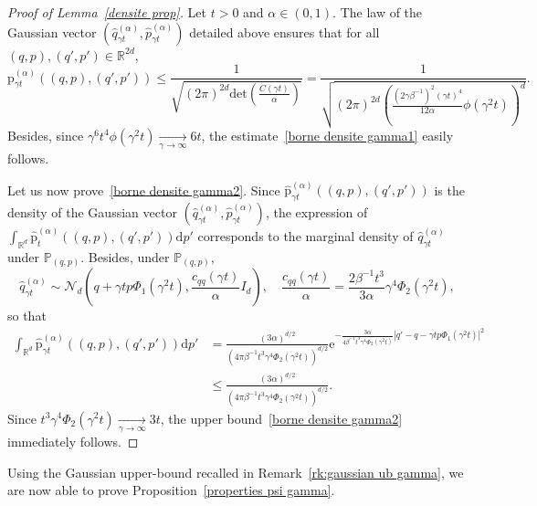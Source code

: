 \documentclass[preprint,EJP]{ejpecp}
\begin{document}
\begin{proof}[Proof of Lemma~\ref{densite prop}]
Let $t>0$ and $\alpha\in(0,1)$. The law of the Gaussian vector $(\widehat{q}_{\gamma t}^{(\alpha)},\widehat{p}_{\gamma t}^{(\alpha)})$ detailed above ensures that for all $(q,p),(q',p')\in\mathbb{R}^{2d}$,
$$\mathrm{p}^{(\alpha)}_{\gamma t}((q,p),(q',p'))\leq\frac{1}{ \sqrt{(2 \pi)^{2d} \mathrm{det}\left(\frac{C(\gamma t)}{\alpha}\right)}}=\frac{1}{ \sqrt{(2 \pi)^{2d} \left(\frac{(2\gamma\beta^{-1})^2 (\gamma t)^4}{12\alpha} \phi(\gamma^2 t)\right)^d}}.$$
Besides, since $\gamma^6 t^4 \phi(\gamma^2 t)\underset{\gamma\rightarrow\infty}{\longrightarrow}6 t$, the estimate~\eqref{borne densite gamma1} easily follows. 

Let us now prove~\eqref{borne densite gamma2}. Since
$\widehat{\mathrm{p}}^{(\alpha)}_{\gamma t}((q,p),(q',p'))$ is the density of the Gaussian vector $(\widehat{q}^{(\alpha)}_{\gamma t}, \widehat{p}^{(\alpha)}_{\gamma t})$, the
expression of
$\int_{\mathbb{R}^d}\widehat{\mathrm{p}}^{(\alpha)}_t((q,p),(q',p'))
\mathrm{d}p'$ corresponds to the marginal density of $\widehat{q}^{(\alpha)}_{\gamma t}$ under $\mathbb{P}_{(q,p)}$. Besides, under $\mathbb{P}_{(q,p)}$, 
\begin{equation*}
  \widehat{q}^{(\alpha)}_{\gamma t} \sim \mathcal{N}_d\left(q + \gamma tp\Phi_1(\gamma^2 t), \frac{c_{qq}(\gamma t)}{\alpha}I_d\right),\quad \frac{c_{qq}(\gamma t)}{\alpha} = \frac{2\beta^{-1} t^3}{3\alpha}\gamma^4\Phi_2(\gamma^2 t),
\end{equation*}
so that  
 \begin{align*}
   \int_{\mathbb{R}^d}\widehat{\mathrm{p}}^{(\alpha)}_{\gamma t}((q,p),(q',p')) \mathrm{d}p'&=\frac{(3\alpha)^{d/2}}{\left(4 \pi\beta^{-1}t^3 \gamma^4\Phi_2(\gamma^2 t)\right)^{d/2}} \mathrm{e}^{-\frac{3 \alpha}{4\beta^{-1}t^3 \gamma^4  \Phi_2(\gamma^2 t)}\left\vert q'-q-\gamma t p \Phi_1(\gamma^2 t) \right\vert^2} \\
    &\leq \frac{(3\alpha)^{d/2}}{\left(4 \pi\beta^{-1}t^3 \gamma^4\Phi_2(\gamma^2 t)\right)^{d/2}}. 
\end{align*}
Since $t^3\gamma^4\Phi_2(\gamma^2 t)\underset{\gamma\rightarrow\infty}{\longrightarrow}3 t$, the upper bound~\eqref{borne densite gamma2} immediately follows.
\end{proof}
Using the Gaussian upper-bound recalled in Remark~\ref{rk:gaussian ub gamma}, we are now able to prove Proposition~\ref{properties psi gamma}.
\end{document}
